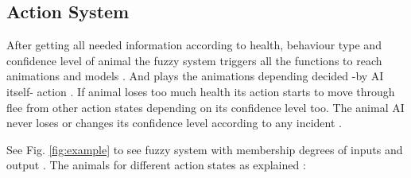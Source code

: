 \subsection{Action System}

After getting all needed information according to health, behaviour type and confidence level of animal the fuzzy system triggers all the functions to reach animations and models . And plays the animations depending decided -by AI itself- action . If animal loses too much health its action starts to move through flee from other action states depending on its confidence level too. The animal AI never loses or changes its confidence level according to any incident .

See Fig. \ref{fig:example} to see fuzzy system with membership degrees of inputs and output . The animals for different action states  as explained :\\


